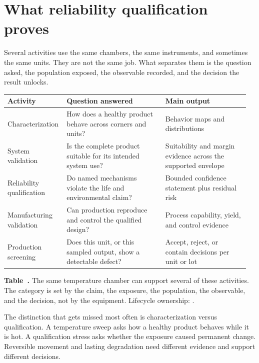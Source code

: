 \section{What reliability qualification proves}
\label{sec:qual-terms}

Several activities use the same chambers, the same instruments, and sometimes
the same units. They are not the same job. What separates them is the question
asked, the population exposed, the observable recorded, and the decision the
result unlocks.

\begin{table}[ht]
\label{tab:qual-activity-split}%
\centering
\setlength{\tabcolsep}{3pt}%
\footnotesize
\renewcommand{\arraystretch}{1.25}%
\begin{tabular}{@{}p{0.22\linewidth}p{0.40\linewidth}p{0.34\linewidth}@{}}
\toprule
Activity & Question answered & Main output \\
\midrule
Characterization & How does a healthy product behave across corners and units? & Behavior maps and distributions \\
\addlinespace[1.0em]
System validation & Is the complete product suitable for its intended system use? & Suitability and margin evidence across the supported envelope \\
\addlinespace[1.0em]
Reliability qualification & Do named mechanisms violate the life and environmental claim? & Bounded confidence statement plus residual risk \\
\addlinespace[1.0em]
Manufacturing validation & Can production reproduce and control the qualified design? & Process capability, yield, and control evidence \\
\addlinespace[1.0em]
Production screening & Does this unit, or this sampled output, show a detectable defect? & Accept, reject, or contain decisions per unit or lot \\
\bottomrule
\end{tabular}
\par\medskip
{\raggedright\footnotesize\textbf{Table~\thetable.} The same temperature
chamber can support several of these activities. The category is set by the
claim, the exposure, the population, the observable, and the decision, not by
the equipment. Lifecycle ownership: .\par}
\end{table}
\FloatBarrier

The distinction that gets missed most often is characterization versus
qualification. A temperature sweep asks how a healthy product behaves while it
is hot. A qualification stress asks whether the exposure caused permanent
change. Reversible movement and lasting degradation need different evidence and
support different decisions.


